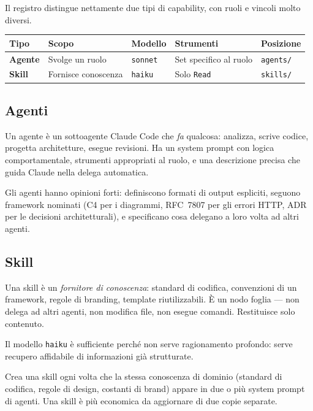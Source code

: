 \documentclass[12pt,a4paper,twoside]{book}
\begin{document}
Il registro distingue nettamente due tipi di capability, con ruoli e vincoli molto diversi.

\begin{center}
\begin{tabular}{lllll}
\toprule
\textbf{Tipo} & \textbf{Scopo} & \textbf{Modello} & \textbf{Strumenti} & \textbf{Posizione} \\
\midrule
\textbf{Agente} & Svolge un ruolo & \texttt{sonnet} & Set specifico al ruolo & \texttt{agents/} \\
\textbf{Skill} & Fornisce conoscenza & \texttt{haiku} & Solo \texttt{Read} & \texttt{skills/} \\
\bottomrule
\end{tabular}
\end{center}

\subsection{Agenti}

Un agente è un sottoagente Claude Code che \textit{fa} qualcosa: analizza, scrive codice, progetta architetture, esegue revisioni. Ha un system prompt con logica comportamentale, strumenti appropriati al ruolo, e una descrizione precisa che guida Claude nella delega automatica.

Gli agenti hanno opinioni forti: definiscono formati di output espliciti, seguono framework nominati (C4 per i diagrammi, RFC~7807 per gli errori HTTP, ADR per le decisioni architetturali), e specificano cosa delegano a loro volta ad altri agenti.

\subsection{Skill}

Una skill è un \textit{fornitore di conoscenza}: standard di codifica, convenzioni di un framework, regole di branding, template riutilizzabili. È un nodo foglia — non delega ad altri agenti, non modifica file, non esegue comandi. Restituisce solo contenuto.

Il modello \texttt{haiku} è sufficiente perché non serve ragionamento profondo: serve recupero affidabile di informazioni già strutturate.

\begin{buonapratica}
Crea una skill ogni volta che la stessa conoscenza di dominio (standard di codifica, regole di design, costanti di brand) appare in due o più system prompt di agenti. Una skill è più economica da aggiornare di due copie separate.
\end{buonapratica}
\end{document}
